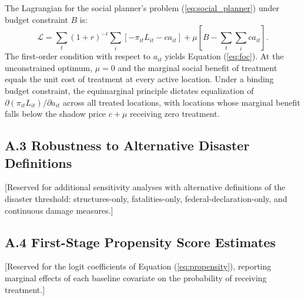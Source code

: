 \documentclass[12pt, letterpaper]{article}
\begin{document}
The Lagrangian for the social planner's problem (\ref{eq:social_planner}) under budget constraint $B$ is:
\begin{equation*}
\mathcal{L} = \sum_t (1+r)^{-t} \sum_i \left[-\pi_{it} L_{it} - c a_{it}\right] + \mu \left[B - \sum_t \sum_i c a_{it}\right].
\end{equation*}
The first-order condition with respect to $a_{it}$ yields Equation (\ref{eq:foc}). At the unconstrained optimum, $\mu = 0$ and the marginal social benefit of treatment equals the unit cost of treatment at every active location. Under a binding budget constraint, the equimarginal principle dictates equalization of $\partial(\pi_{it} L_{it}) / \partial a_{it}$ across all treated locations, with locations whose marginal benefit falls below the shadow price $c + \mu$ receiving zero treatment.

\subsection*{A.3 Robustness to Alternative Disaster Definitions}

[Reserved for additional sensitivity analyses with alternative definitions of the disaster threshold: structures-only, fatalities-only, federal-declaration-only, and continuous damage measures.]

\subsection*{A.4 First-Stage Propensity Score Estimates}

[Reserved for the logit coefficients of Equation (\ref{eq:propensity}), reporting marginal effects of each baseline covariate on the probability of receiving treatment.]
\end{document}
